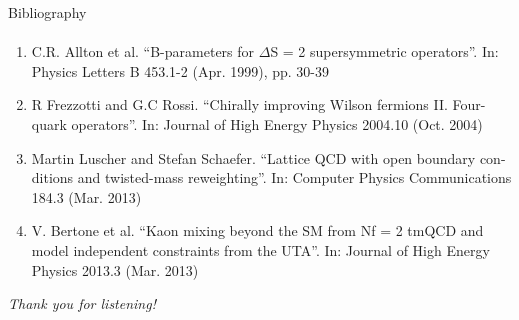 \documentclass{beamer}
\begin{document}
\begin{frame}{Bibliography}
      \framesubtitle{\hspace*{1pt}}
      \begin{enumerate}
            \item C.R. Allton et al. ``B-parameters for $\Delta$S = 2 supersymmetric operators''. In: Physics Letters B 453.1-2 (Apr. 1999), pp. 30-39
            \item R Frezzotti and G.C Rossi. ``Chirally improving Wilson fermions II. Four- quark operators''. In: Journal of High Energy Physics 2004.10 (Oct. 2004)
            \item Martin Luscher and Stefan Schaefer. ``Lattice QCD with open boundary con- ditions and twisted-mass reweighting''. In: Computer Physics Communications 184.3 (Mar. 2013)
            \item V. Bertone et al. ``Kaon mixing beyond the SM from Nf = 2 tmQCD and model independent constraints from the UTA''. In: Journal of High Energy Physics 2013.3 (Mar. 2013)
      \end{enumerate}
\end{frame}

\begin{chapter}{}{\emph{Thank you for listening!}}
      \framesubtitle{\hspace*{1pt}}
\end{chapter}
\end{document}
